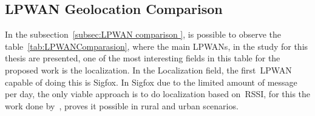
\newpage
\subsection{LPWAN Geolocation Comparison}
\label{sec:LPWNA_Geolocation_SOTA}


In the subsection~\ref{subsec:LPWAN comparison }, is possible to observe the table~\ref{tab:LPWANComparasion}, where the main LPWANs, in the study for this thesis are presented, one of the most interesting fields in this table for the proposed work is the localization. In the Localization field, the first~\gls{LPWAN} capable of doing this is Sigfox. In Sigfox due to the limited amount of message per day, the only viable approach is to do localization based on~\gls{RSSI}, for this the work done by~\cite{Aernouts2018RL2}, proves it possible in rural and urban scenarios.

